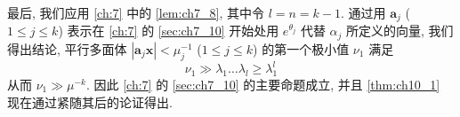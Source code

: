 最后, 我们应用 \autoref{ch:7} 中的 \autoref{lem:ch7_8}, 其中令 $l = n = k - 1$. 通过用 $\mathbf{a}_j$ ($1 \le j \le k$) 表示在 \autoref{ch:7} 的 \autoref{sec:ch7_10} 开始处用 $e^{\theta_j}$ 代替 $\alpha_j$ 所定义的向量, 我们得出结论, 平行多面体 $|\mathbf{a}_j \mathbf{x}| < \mu_j^{-1}$ ($1 \le j \le k$) 的第一个极小值 $\nu_1$ 满足
\[\nu_1 \gg \lambda_1 \dots \lambda_l \geqslant \lambda_1^l\]
从而 $\nu_1 \gg \mu^{-k}$. 因此 \autoref{ch:7} 的 \autoref{sec:ch7_10} 的主要命题成立, 并且 \autoref{thm:ch10_1} 现在通过紧随其后的论证得出.
